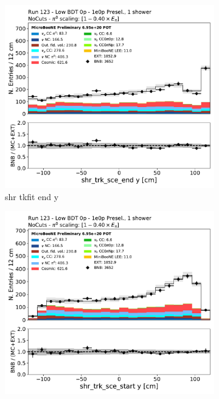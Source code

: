 \begin{figure}[H]
    \centering
    \begin{subfigure}{0.3\textwidth}
    \includegraphics[width=1.0\textwidth]{1e0p/Low_BDT_Sideband/shr_trk_sce_end_y.pdf}
    \caption{shr tkfit end y}
    \end{subfigure}
    \begin{subfigure}{0.3\textwidth}
    \includegraphics[width=1.0\textwidth]{1e0p/Low_BDT_Sideband/shr_trk_sce_start_y.pdf}

\end{subfigure}
\end{figure}
